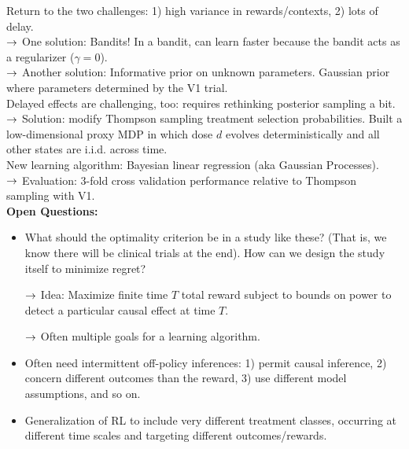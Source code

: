 Return to the two challenges: 1) high variance in rewards/contexts, 2) lots of delay. \\

$\rightarrow$ One solution: Bandits! In a bandit, can learn faster because the bandit acts as a regularizer ($\gamma = 0$). \\

$\rightarrow$ Another solution: Informative prior on unknown parameters. Gaussian prior where parameters determined by the V1 trial. \\

Delayed effects are challenging, too: requires rethinking posterior sampling a bit. \\

$\rightarrow$ Solution: modify Thompson sampling treatment selection probabilities. Built a low-dimensional proxy MDP in which dose $d$ evolves deterministically and all other states are i.i.d. across time. \\

New learning algorithm: Bayesian linear regression (aka Gaussian Processes). \\

$\rightarrow$ Evaluation: 3-fold cross validation performance relative to Thompson sampling with V1. \\

{\bf Open Questions:}
\begin{itemize}
    \item What should the optimality criterion be in a study like these? (That is, we know there will be clinical trials at the end). How can we design the study itself to minimize regret?
    
    $\rightarrow$ Idea: Maximize finite time $T$ total reward subject to bounds on power to detect a particular causal effect at time $T$.
    
    $\rightarrow$ Often multiple goals for a learning algorithm.
    
    \item Often need intermittent off-policy inferences: 1) permit causal inference, 2) concern different outcomes than the reward, 3) use different model assumptions, and so on.
    
    \item Generalization of RL to include very different treatment classes, occurring at different time scales and targeting different outcomes/rewards.
\end{itemize}


\spacerule

